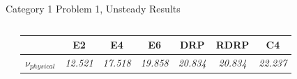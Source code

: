 \begin{frame}{Category 1 Problem 1, Unsteady Results}
  \begin{columns}
    \begin{table}[htp!]
    \centering
    \label{tab:C1P1_CFL}
      \begin{tabular}{|l|c|c|c|c|c|c|}
      \hline & \multicolumn{1}{c|}{\textbf{E2}} & 
      \multicolumn{1}{c|}{\textbf{E4}} & 
      \multicolumn{1}{c|}{\textbf{E6}} & 
      \multicolumn{1}{c|}{\textbf{DRP}} & 
      \multicolumn{1}{c|}{\textbf{RDRP}}& 
      \multicolumn{1}{c|}{\textbf{C4}}\\ \hline
      \textbf{$\nu_{physical}$} & 
      \textit{12.521} & 
      \textit{17.518} & 
      \textit{19.858} & 
      \textit{20.834} & 
      \textit{20.834} & 
      \textit{22.237}\\ \hline
      \end{tabular}
    \end{table}
    ~~ \newline
    \begin{figure}[hbtp!]
    	\centering
    	\includegraphics[width=1.0\textheight]{Figures/C1P1_MaxDisturbance_zoom}
    	\label{fig:Unsteady_C1P1}
    \end{figure}
  \end{columns}
\end{frame}


